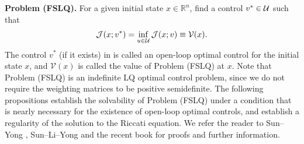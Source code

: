 \documentclass[11pt,times,twoside]{article}
\def\dbR{\mathbb{R}} \def\sR{\mathscr{R}} \def\fR{\mathfrak{R}} \def\cR{{\cal R}} \def\BR{{\bf R}} \def\Br{{\bf r}}
\def\ms{\medskip}         \def\da{\mathop{\downarrow}}       \def\rt{\right}
\begin{document}
\ms

{\bf Problem (FSLQ).} For a given initial state $x\in\dbR^n$, find a control $v^*\in{\cal U}$ such that
%
\begin{align}\label{FValue}
  {\cal J}(x;v^*)=\inf_{u\in{\cal U}}{\cal J}(x;v)\equiv {\cal V}(x).
\end{align}
%
The control $v^{*}$ (if it exists) in  is called an open-loop optimal control for the initial state $x$, and $\mathcal{V}(x)$ is called the value of Problem (FSLQ) at $x$. Note that Problem (FSLQ) is an indefinite LQ optimal control problem, since we do not require the weighting matrices to be positive semidefinite.
The following propositions establish the solvability of Problem (FSLQ) under a condition that is nearly necessary for the existence of open-loop optimal controls, and establish a regularity of the solution to the Riccati equation. We refer the reader to Sun--Yong \cite{Sun-Yong 2014}, Sun--Li--Yong \cite{Sun-Li-Yong 2016} and the recent book \cite{Sun-Yong 2020}
for proofs and further information.
%
\end{document}
